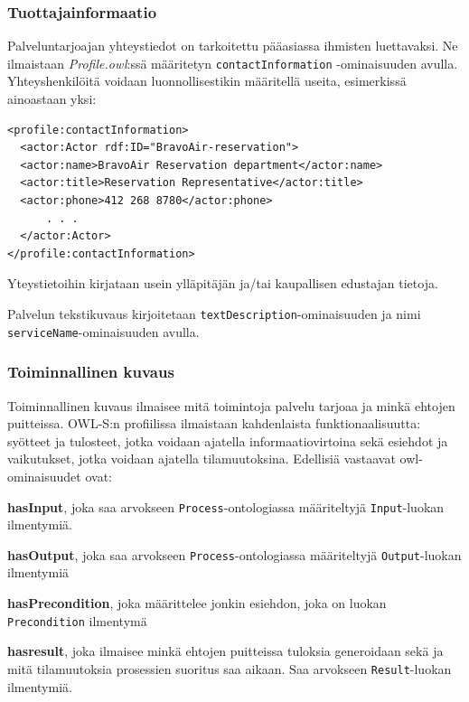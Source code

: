 \documentclass[finnish]{tktltiki2}
\theoremstyle{definition}
\theoremstyle{remark}
\begin{document}
\subsubsection{Tuottajainformaatio}

Palveluntarjoajan yhteystiedot on tarkoitettu pääasiassa ihmisten luettavaksi. Ne ilmaistaan \textit{Profile.owl}:ssä määritetyn \texttt{contactInformation} -ominaisuuden avulla. Yhteyshenkilöitä voidaan luonnollisestikin määritellä useita, esimerkissä ainoastaan yksi\cite{daml}:  

\begin{verbatim}
<profile:contactInformation>
  <actor:Actor rdf:ID="BravoAir-reservation">
  <actor:name>BravoAir Reservation department</actor:name>
  <actor:title>Reservation Representative</actor:title>
  <actor:phone>412 268 8780</actor:phone>
      . . .
  </actor:Actor>
</profile:contactInformation>
\end{verbatim} 

Yteystietoihin kirjataan usein ylläpitäjän ja/tai kaupallisen edustajan tietoja. 

Palvelun tekstikuvaus kirjoitetaan \texttt{textDescription}-ominaisuuden ja nimi \texttt{serviceName}-ominaisuuden avulla.  


\subsubsection{Toiminnallinen kuvaus}

Toiminnallinen kuvaus ilmaisee mitä toimintoja palvelu tarjoaa ja minkä ehtojen puitteissa. OWL-S:n profiilissa ilmaistaan kahdenlaista funktionaalisuutta: syötteet ja tulosteet, jotka voidaan ajatella informaatiovirtoina sekä esiehdot ja vaikutukset, jotka voidaan ajatella tilamuutoksina. Edellisiä vastaavat owl-ominaisuudet ovat\cite{OWLS}:

\textbf{hasInput}, joka saa arvokseen \texttt{Process}-ontologiassa määriteltyjä \texttt{Input}-luokan ilmentymiä. 


\textbf{hasOutput}, joka saa arvokseen \texttt{Process}-ontologiassa määriteltyjä \texttt{Output}-luokan ilmentymiä


\textbf{hasPrecondition}, joka määrittelee jonkin esiehdon, joka on luokan \texttt{Precondition} ilmentymä


\textbf{hasresult}, joka ilmaisee minkä ehtojen puitteissa tuloksia generoidaan sekä ja mitä tilamuutoksia prosessien suoritus saa aikaan. Saa arvokseen \texttt{Result}-luokan ilmentymiä.  
\end{document}
